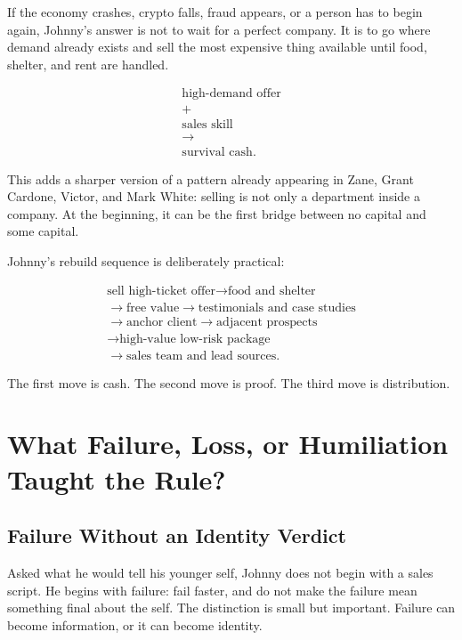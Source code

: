 \documentclass[11pt,oneside]{book}
\begin{document}
If the economy crashes, crypto falls, fraud appears, or a person has to begin again, Johnny's answer is not to wait for a perfect company. It is to go where demand already exists and sell the most expensive thing available until food, shelter, and rent are handled.

\begin{equation}
\begin{gathered}
\text{high-demand offer}\\
+\\
\text{sales skill}\\
\longrightarrow\\
\text{survival cash}.
\end{gathered}
\end{equation}

This adds a sharper version of a pattern already appearing in Zane, Grant Cardone, Victor, and Mark White: selling is not only a department inside a company. At the beginning, it can be the first bridge between no capital and some capital.

Johnny's rebuild sequence is deliberately practical:

\begin{equation}
\begin{gathered}
\text{sell high-ticket offer}\to\text{food and shelter}\\
\to\text{free value}\to\text{testimonials and case studies}\\
\to\text{anchor client}\to\text{adjacent prospects}\\
\to\text{high-value low-risk package}\\
\to\text{sales team and lead sources}.
\end{gathered}
\end{equation}

The first move is cash. The second move is proof. The third move is distribution.

\chapter{What Failure, Loss, or Humiliation Taught the Rule?}

\section{Failure Without an Identity Verdict}

Asked what he would tell his younger self, Johnny does not begin with a sales script. He begins with failure: fail faster, and do not make the failure mean something final about the self. The distinction is small but important. Failure can become information, or it can become identity.
\end{document}
